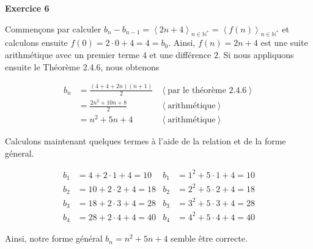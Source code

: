 \documentclass{article}
\newcommand{\tuple}[1]{\ensuremath{\left\langle #1 \right\rangle}}
\begin{document}
\textbf{Exercice 6}

\vspace{0.5cm}

Commençons par calculer $b_n - b_{n-1} = \tuple{2n + 4}_{n \in \mathbb{N}^{*}} = \tuple{f(n)}_{n \in \mathbb{N}^{*}}$ et calculons ensuite $f(0) = 2 \cdot 0 + 4 = 4 = b_0$. Ainsi, $f(n) = 2n + 4$ est une suite arithmétique avec un premier terme $4$ et une différence $2$. Si nous appliquons ensuite le Théorème 2.4.6, nous obtenons

\begin{align*}
b_n &= \frac{(4 + 4 + 2n)(n+1)}{2} 
&\tuple{ \text{par le théorème 2.4.6} } \\
&= \frac{2n^2 + 10n + 8}{2} 
&\tuple{ \text{arithmétique} } \\
&= n^2 + 5n + 4 
&\tuple{ \text{arithmétique} }
\end{align*}

Calculons maintenant quelques termes à l'aide de la relation et de la forme géneral. 

\begin{align*}
b_1 &= 4 + 2 \cdot 1 + 4 = 10 
&b_1 &= 1^2 + 5 \cdot 1 + 4 = 10 \\
b_2 &= 10 + 2 \cdot 2 + 4 = 18 
&b_2 &= 2^2 + 5 \cdot 2 + 4 = 18 \\
b_3 &= 18 + 2 \cdot 3 + 4 = 28 
&b_3 &= 3^2 + 5 \cdot 3 + 4 = 28 \\
b_4 &= 28 + 2 \cdot 4 + 4 = 40 
&b_4 &= 4^2 + 5 \cdot 4 + 4 = 40
\end{align*}

Ainsi, notre forme général $b_n = n^2 + 5n + 4$ semble être correcte.
\end{document}
